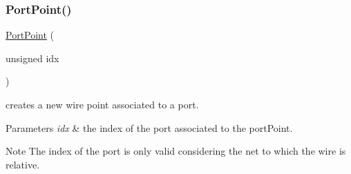 \subsubsection{\texorpdfstring{Port\+Point()}{PortPoint()}}
{\footnotesize\ttfamily \mbox{\hyperlink{class_open_chams_1_1_port_point}{Port\+Point}} (\begin{DoxyParamCaption}\item[{unsigned}]{idx }\end{DoxyParamCaption})\hspace{0.3cm}{\ttfamily [inline]}}



creates a new wire point associated to a port. 


\begin{DoxyParams}{Parameters}
{\em idx} & the index of the port associated to the port\+Point.\\
\hline
\end{DoxyParams}
\begin{DoxyNote}{Note}
The index of the port is only valid considering the net to which the wire is relative. 
\end{DoxyNote}
